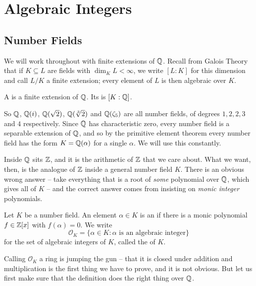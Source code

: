 \documentclass[a4paper]{scrartcl}
\renewcommand{\OO}{\mathcal{O}}
\begin{document}
\section{Algebraic Integers}\label{sec:alg}

\subsection{Number Fields}

We will work throughout with finite extensions of $\mathbb{Q}$. Recall from Galois Theory that if $K \subseteq L$ are fields with $\dim_K L < \infty$, we write $[L:K]$ for this dimension and call $L/K$ a finite extension; every element of $L$ is then algebraic over $K$.

\begin{definition}
	A  is a finite extension of $\mathbb{Q}$. Its  is $[K:\mathbb{Q}]$.
\end{definition}

So $\mathbb{Q}$, $\mathbb{Q}(i)$, $\mathbb{Q}(\sqrt{2})$, $\mathbb{Q}(\sqrt[3]{2})$ and $\mathbb{Q}(\zeta_5)$ are all number fields, of degrees $1, 2, 2, 3$ and $4$ respectively. Since $\mathbb{Q}$ has characteristic zero, every number field is a separable extension of $\mathbb{Q}$, and so by the primitive element theorem every number field has the form $K = \mathbb{Q}(\alpha)$ for a single $\alpha$. We will use this constantly.

Inside $\mathbb{Q}$ sits $\mathbb{Z}$, and it is the arithmetic of $\mathbb{Z}$ that we care about. What we want, then, is the analogue of $\mathbb{Z}$ inside a general number field $K$. There is an obvious wrong answer -- take everything that is a root of \emph{some} polynomial over $\mathbb{Q}$, which gives all of $K$ -- and the correct answer comes from insisting on \emph{monic integer} polynomials.

\begin{definition}
	Let $K$ be a number field. An element $\alpha \in K$ is an  if there is a monic polynomial $f \in \mathbb{Z}[x]$ with $f(\alpha) = 0$. We write
	$$\OO_K = \{\alpha \in K : \alpha \text{ is an algebraic integer}\}$$
	for the set of algebraic integers of $K$, called the  of $K$.
\end{definition}

Calling $\OO_K$ a ring is jumping the gun -- that it is closed under addition and multiplication is the first thing we have to prove, and it is not obvious. But let us first make sure that the definition does the right thing over $\mathbb{Q}$.
\end{document}
